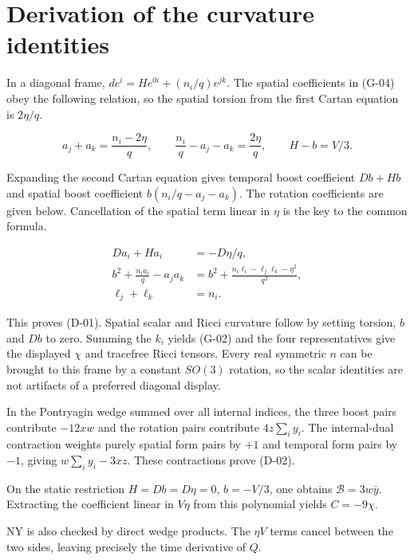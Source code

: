 \section{Derivation of the curvature identities}

In a diagonal frame, $de^i=H e^{0i}+(n_i/q)e^{jk}$. The spatial coefficients in (G-04) obey the following relation, so the spatial torsion from the first Cartan equation is $2\eta/q$.

\begin{equation}\tag{R-01}\label{eq:R-01}
a_j+a_k=\frac{n_i-2\eta}{q},\qquad
\frac{n_i}{q}-a_j-a_k=\frac{2\eta}{q},\qquad H-b=V/3.
\end{equation}

Expanding the second Cartan equation gives temporal boost coefficient $Db+Hb$ and spatial boost coefficient $b(n_i/q-a_j-a_k)$. The rotation coefficients are given below. Cancellation of the spatial term linear in $\eta$ is the key to the common formula.

\begin{equation}\tag{R-02}\label{eq:R-02}
\begin{aligned}
Da_i+Ha_i&=-D\eta/q,\\
b^2+\frac{n_i a_i}{q}-a_ja_k
&=b^2+\frac{n_i\ell_i-\ell_j\ell_k-\eta^2}{q^2},\\
\ell_j+\ell_k&=n_i.
\end{aligned}
\end{equation}

This proves (D-01). Spatial scalar and Ricci curvature follow by setting torsion, $b$ and $Db$ to zero. Summing the $k_i$ yields (G-02) and the four representatives give the displayed $\chi$ and tracefree Ricci tensors. Every real symmetric $n$ can be brought to this frame by a constant $SO(3)$ rotation, so the scalar identities are not artifacts of a preferred diagonal display.

In the Pontryagin wedge summed over all internal indices, the three boost pairs contribute $-12xw$ and the rotation pairs contribute $4z\sum_i y_i$. The internal-dual contraction weights purely spatial form pairs by $+1$ and temporal form pairs by $-1$, giving $w\sum_i y_i-3xz$. These contractions prove (D-02).

On the static restriction $H=Db=D\eta=0$, $b=-V/3$, one obtains $\mathcal B=3w\bar y$. Extracting the coefficient linear in $V\eta$ from this polynomial yields $C=-9\chi$.

NY is also checked by direct wedge products. The $\eta V$ terms cancel between the two sides, leaving precisely the time derivative of $Q$.

